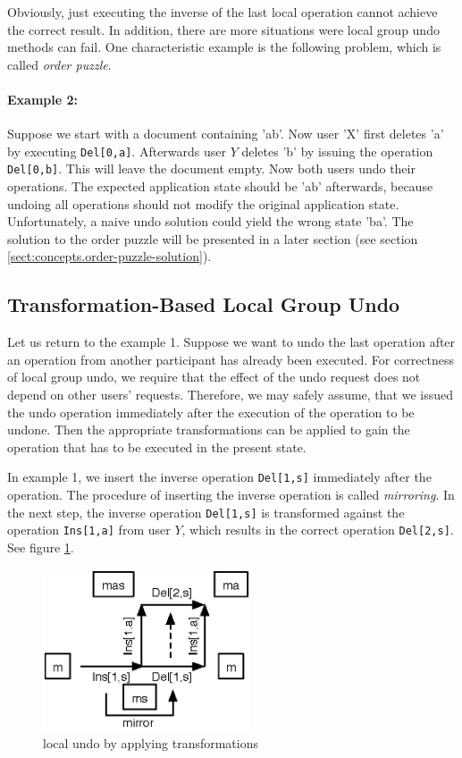 Obviously, just executing the inverse of the last local operation cannot achieve the correct result. In addition, there are more situations were local group undo methods can fail. One characteristic example is the following problem, which is called \emph{order puzzle}.

\paragraph{Example 2:}
\label{example2}
Suppose we start with a document containing 'ab'. Now user 'X' first deletes 'a' by executing \texttt{Del[0,a]}. Afterwards user $Y$ deletes 'b' by issuing the operation \texttt{Del[0,b]}. This will leave the document empty. Now both users undo their operations. The expected application state should be 'ab' afterwards, because undoing all operations should not modify the original application state. Unfortunately, a naive undo solution could yield the wrong state 'ba'. The solution to the order puzzle will be presented in a later section (see section \ref{sect:concepts.order-puzzle-solution}).

\subsection{Transformation-Based Local Group Undo}
Let us return to the example 1. Suppose we want to undo the last operation after an operation from another participant has already been executed. For correctness of local group undo, we require that the effect of the undo request does not depend on other users' requests. Therefore, we may safely assume, that we issued the undo operation immediately after the execution of the operation to be undone. Then the appropriate transformations can be applied to gain the operation that has to be executed in the present state. 

In example 1, we insert the inverse operation \texttt{Del[1,s]} immediately after the operation. The procedure of inserting the inverse operation is called \emph{mirroring}. In the next step, the inverse operation \texttt{Del[1,s]} is transformed against the operation \texttt{Ins[1,a]} from user $Y$, which results in the correct operation \texttt{Del[2,s]}. See figure \ref{fig:concepts.undobytransformation}.

\begin{figure}[htb]
 \centering
 \includegraphics[width=6.13cm,height=4.79cm]{../../images/concepts_undobytransformation.eps}
 \caption{local undo by applying transformations}
 \label{fig:concepts.undobytransformation}
\end{figure}

